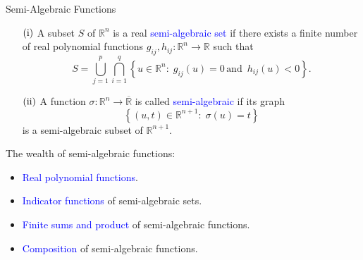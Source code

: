 \documentclass[9pt,handout]{beamer} %
\newcommand{\s}{\sigma}
\newcommand{\rr}{\mathbb{R}} %
\newcommand{\dom}[1]{\mathrm{dom}\,{#1}} %
\begin{document}
	\begin{frame}{Semi-Algebraic Functions}
        \begin{definition}
            \begin{itemize}
                \item[$\rm{(i)}$] A subset $S$ of $\rr^{n}$ is a real \textcolor{blue}{semi-algebraic set} if there exists a finite number of real polynomial functions $g_{ij} , h_{ij} : \rr^{n} \rightarrow \rr$ such that
                    \begin{equation*}
                        S = \bigcup_{j = 1}^{p} \bigcap_{i = 1}^{q} \left\{ u \in \rr^{n} : 
                        \; g_{ij}\left(u\right) = 0 \, \text{and } \, h_{ij}\left(u\right) < 
                        0 \right\}.
                    \end{equation*}
                \item[$\rm{(ii)}$] A function $\s : \rr^{n} \rightarrow \overline{\rr}$ is 
                	called \textcolor{blue}{semi-algebraic} if its graph
                    \begin{equation*}
                        \left\{ \left(u , t\right) \in \rr^{n + 1} : \; \s\left(u\right) = t 
                        \right\}
                    \end{equation*}
                    is a semi-algebraic subset of $\rr^{n + 1}$.
            \end{itemize}
        \end{definition}
        \pause
        The wealth of semi-algebraic functions:
        \begin{itemize}[<+->]
        	\item \textcolor{blue}{Real polynomial functions}.
            \item \textcolor{blue}{Indicator functions} of semi-algebraic sets.
            \item \textcolor{blue}{Finite sums and product} of semi-algebraic functions. 
            \item \textcolor{blue}{Composition} of semi-algebraic functions.
        \end{itemize}
    \end{frame}
\end{document}
